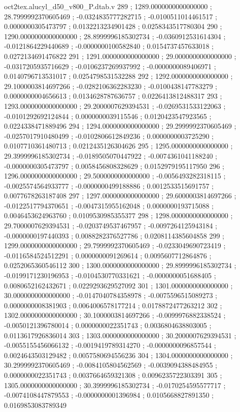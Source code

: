 \begin{filecontents}[overwrite]{oct2tex.alucyl_d50_v800_P.dtab.v}
289 ; 1289.0000000000000000 ; 28.7999992370605469 ; -0.0324835777282715 ; -0.0100511014461517 ; 0.0000000305473797 ; 0.0132213234901428 ; 0.0258343517780304
290 ; 1290.0000000000000000 ; 28.8999996185302734 ; -0.0360912531614304 ; -0.0121864229440689 ; -0.0000000100582840 ; 0.0154737457633018 ; 0.0272134691476822
291 ; 1291.0000000000000000 ; 29.0000000000000000 ; -0.0317205935716629 ; -0.0106237269937992 ; -0.0000000089406971 ; 0.0140796713531017 ; 0.0254798531532288
292 ; 1292.0000000000000000 ; 29.1000003814697266 ; -0.0282106362283230 ; -0.0100438147783279 ; 0.0000000004656613 ; 0.0134628787636757 ; 0.0226413812488317
293 ; 1293.0000000000000000 ; 29.2000007629394531 ; -0.0269531533122063 ; -0.0101292692124844 ; 0.0000000039115546 ; 0.0120423547923565 ; 0.0224338471889496
294 ; 1294.0000000000000000 ; 29.2999992370605469 ; -0.0257017910480499 ; -0.0102806612849236 ; 0.0000000003725290 ; 0.0107710361480713 ; 0.0212435126304626
295 ; 1295.0000000000000000 ; 29.3999996185302734 ; -0.0189505070447922 ; -0.0074361041188240 ; -0.0000000305473797 ; 0.0058456808328629 ; 0.0152979195117950
296 ; 1296.0000000000000000 ; 29.5000000000000000 ; -0.0056493282318115 ; -0.0025574564933777 ; -0.0000000499188886 ; 0.0012533515691757 ; 0.0077678263187408
297 ; 1297.0000000000000000 ; 29.6000003814697266 ; -0.0122517794370651 ; -0.0047315955162048 ; 0.0000000193715088 ; 0.0046453624963760 ; 0.0109530985355377
298 ; 1298.0000000000000000 ; 29.7000007629394531 ; -0.0203749537467957 ; -0.0097264125943184 ; -0.0000000197440393 ; 0.0088282376527786 ; 0.0208114385604858
299 ; 1299.0000000000000000 ; 29.7999992370605469 ; -0.0233049690723419 ; -0.0116584524512291 ; 0.0000000091269614 ; 0.0095607712864876 ; 0.0252065360546112
300 ; 1300.0000000000000000 ; 29.8999996185302734 ; -0.0199171230196953 ; -0.0104530770331621 ; -0.0000000051688405 ; 0.0080652162432671 ; 0.0229293629527092
301 ; 1301.0000000000000000 ; 30.0000000000000000 ; -0.0147040784358978 ; -0.0075596515089273 ; 0.0000000008381903 ; 0.0064006578177214 ; 0.0178872477263212
302 ; 1302.0000000000000000 ; 30.1000003814697266 ; -0.0099976882338524 ; -0.0050121396780014 ; 0.0000000022351743 ; 0.0036804638803005 ; 0.0113617926836014
303 ; 1303.0000000000000000 ; 30.2000007629394531 ; -0.0055155456066132 ; -0.0019419789314270 ; -0.0000000096857544 ; 0.0024643503129482 ; 0.0057580694556236
304 ; 1304.0000000000000000 ; 30.2999992370605469 ; -0.0084105804562569 ; -0.0039094388484955 ; 0.0000000022351743 ; 0.0037664659321308 ; 0.0096235722303391
305 ; 1305.0000000000000000 ; 30.3999996185302734 ; -0.0170254595577717 ; -0.0074108447879553 ; -0.0000000001396984 ; 0.0105668827891350 ; 0.0169853083789349

\end{filecontents}
